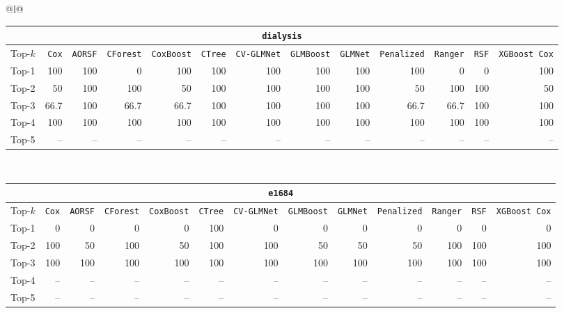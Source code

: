 \begin{longtable}{@{}l@{}}
\begin{tabular}{@{}l*{12}{r}@{}}
\multicolumn{13}{c}{\texttt{dialysis}} \\
\midrule
Top-$k$ & \texttt{Cox} & \texttt{AORSF} & \texttt{CForest} & \texttt{CoxBoost} & \texttt{CTree} & \texttt{CV-GLMNet} & \texttt{GLMBoost} & \texttt{GLMNet} & \texttt{Penalized} & \texttt{Ranger} & \texttt{RSF} & \texttt{XGBoost Cox} \\
\midrule
Top-1 & 100 & 100 & 0 & 100 & 100 & 100 & 100 & 100 & 100 & 0 & 0 & 100 \\
Top-2 & 50 & 100 & 100 & 50 & 100 & 100 & 100 & 100 & 50 & 100 & 100 & 50 \\
Top-3 & 66.7 & 100 & 66.7 & 66.7 & 100 & 100 & 100 & 100 & 66.7 & 66.7 & 100 & 100 \\
Top-4 & 100 & 100 & 100 & 100 & 100 & 100 & 100 & 100 & 100 & 100 & 100 & 100 \\
Top-5 & -- & -- & -- & -- & -- & -- & -- & -- & -- & -- & -- & -- \\
\end{tabular} \\
\midrule

\begin{tabular}{@{}l*{12}{r}@{}}
\multicolumn{13}{c}{\texttt{e1684}} \\
\midrule
Top-$k$ & \texttt{Cox} & \texttt{AORSF} & \texttt{CForest} & \texttt{CoxBoost} & \texttt{CTree} & \texttt{CV-GLMNet} & \texttt{GLMBoost} & \texttt{GLMNet} & \texttt{Penalized} & \texttt{Ranger} & \texttt{RSF} & \texttt{XGBoost Cox} \\
\midrule
Top-1 & 0 & 0 & 0 & 0 & 100 & 0 & 0 & 0 & 0 & 0 & 0 & 0 \\
Top-2 & 100 & 50 & 100 & 50 & 100 & 100 & 50 & 50 & 50 & 100 & 100 & 100 \\
Top-3 & 100 & 100 & 100 & 100 & 100 & 100 & 100 & 100 & 100 & 100 & 100 & 100 \\
Top-4 & -- & -- & -- & -- & -- & -- & -- & -- & -- & -- & -- & -- \\
Top-5 & -- & -- & -- & -- & -- & -- & -- & -- & -- & -- & -- & -- \\
\end{tabular} \\
\midrule


\end{longtable}
